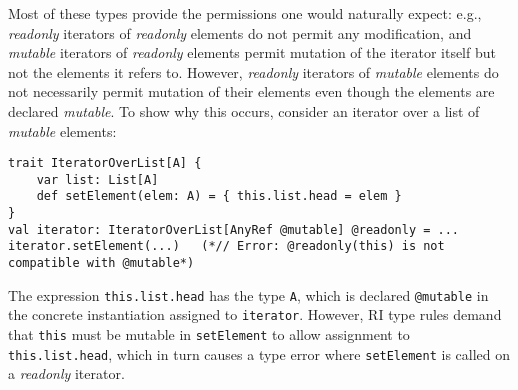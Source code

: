 \documentclass[letterpaper,11pt]{article}
\newcommand{\code}[1]{\lstinline$#1$}
\theoremstyle{definition}
\theoremstyle{remark}
\begin{document}
Most of these types provide the permissions one would naturally expect: e.g.,
\emph{readonly} iterators of \emph{readonly} elements do not permit any modification, and
\emph{mutable} iterators of \emph{readonly} elements permit mutation of the iterator itself
but not the elements it refers to.
However, \emph{readonly} iterators of \emph{mutable} elements do not necessarily
permit mutation of their elements even though the elements are declared \emph{mutable}.
To show why this occurs, consider an iterator over a list of \emph{mutable} elements:


\begin{lstlisting}
trait IteratorOverList[A] {
	var list: List[A]
	def setElement(elem: A) = { this.list.head = elem }
}
val iterator: IteratorOverList[AnyRef @mutable] @readonly = ...
iterator.setElement(...)   (*// Error: @readonly(this) is not compatible with @mutable*)
\end{lstlisting}

The expression \code{this.list.head} has the type \code{A},
which is declared \code{@mutable} in the concrete instantiation assigned to \code{iterator}.
However, RI type rules demand that
\code{this} must be mutable in \code{setElement} to allow assignment to \code{this.list.head},
which in turn causes a type error where \code{setElement} is called on a \emph{readonly}
iterator.
\end{document}
